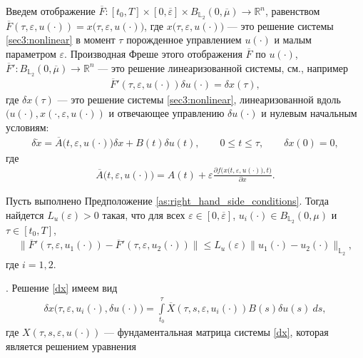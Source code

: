 \documentclass[../main.tex]{subfiles}
\begin{document}
Введем отображение $\overline{F}: [t_0,T] \times [0,\overline{\varepsilon}] \times B_{\mathbb{L}_2}(0,\overline{\mu}) \to \mathbb{R}^n$, равенством $\overline{F}(\tau,\varepsilon, u(\cdot)) = x \big(\tau,\varepsilon, u(\cdot)\big) $, где $x \big(\tau,\varepsilon, u(\cdot)\big)$ --- это решение системы \eqref{sec3:nonlinear} в момент $\tau$ порожденное управлением $u(\cdot)$ и малым параметром  $\varepsilon$.  Производная Фреше этого отображения $\overline{F}$ по $u(\cdot)$, $\overline{F}': B_{\mathbb{L}_2}(0,\overline{\mu}) \to \mathbb{R}^n $ --- это решение линеаризованной системы, см., например \cite{GusZyk}
\begin{gather}\label{dF}
	\overline{F}'(\tau,\varepsilon, u(\cdot)) \delta u(\cdot) = \delta x(\tau), 
\end{gather}
где $\delta x(\tau)$ --- это решение системы \eqref{sec3:nonlinear}, линеаризованной вдоль $(u(\cdot),x(\cdot,\varepsilon, u(\cdot))$ и отвечающее управлению $\delta u(\cdot)$ и нулевым начальным условиям:
\begin{gather}\label{dx}
	\delta\dot{x} =   \overline{A}\big(t,\varepsilon,u(\cdot)\big) \delta x +  B(t)\delta u(t), \qquad 0\leqslant t \leqslant \tau, \qquad \delta x(0) = 0,
\end{gather}
где
\begin{gather*}
	\overline{A}\big(t,\varepsilon,u(\cdot)\big) = A(t) +\varepsilon \frac{\partial f\big(x(t,\varepsilon,u(\cdot)\big),t\big)}{\partial x}.
\end{gather*}
\begin{lemma}\label{lem:Lipdx}
	Пусть выполнено Предположение \ref{as:right_hand_side_conditions}.  Тогда найдется  $L_u(\varepsilon) > 0$ такая, что для всех $\varepsilon\in [0,\overline{\varepsilon}]$, $u_i(\cdot) \in B_{\mathbb{L}_2}(0,\mu)$ и $\tau \in [t_0,T]$, 
	\begin{gather*}
		\| \overline{F}'(\tau,\varepsilon, u_1(\cdot)) - \overline{F}'(\tau,\varepsilon, u_2(\cdot)) \| \leqslant L_u(\varepsilon) \| u_1(\cdot) - u_2(\cdot) \|_{\mathbb{L}_2},
	\end{gather*}
	где $i = 1,2$.
\end{lemma}
\doc. 
Решение \eqref{dx} имеем вид
\begin{gather}\label{xu}
	\delta x\big(\tau,\varepsilon,u_i(\cdot),\delta u(\cdot)\big) = \int\limits_{t_0}^{\tau}  \overline{X}(\tau,s,\varepsilon,u_i(\cdot)) B(s) \delta u(s) \ ds,
\end{gather}
где $X(\tau,s,\varepsilon,u(\cdot)) $ --- фундаментальная матрица системы \eqref{dx}, которая является решением уравнения
\end{document}
